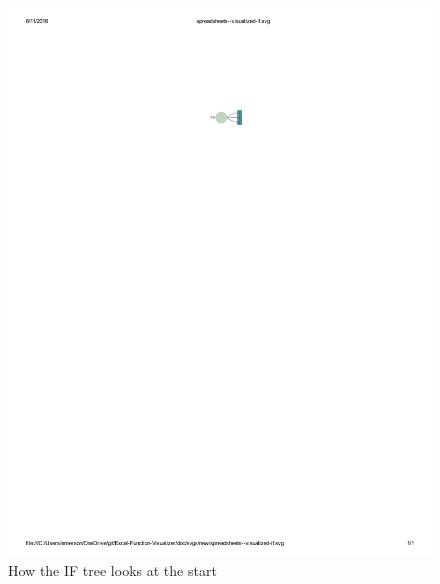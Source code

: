 \documentclass[conference]{IEEEtran}
\begin{document}
	\begin{figure}[h] \centering \includegraphics[scale=.5]{start} 
		\caption{How the IF tree looks at the start} \label{fig:startpic} \end{figure}
	
\end{document}
